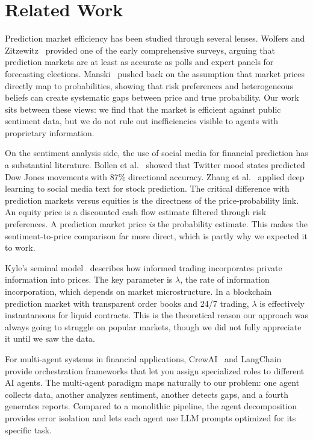 \documentclass[conference]{IEEEtran}
\begin{document}
\section{Related Work}

Prediction market efficiency has been studied through several lenses. Wolfers and Zitzewitz~\cite{wolfers2004} provided one of the early comprehensive surveys, arguing that prediction markets are at least as accurate as polls and expert panels for forecasting elections. Manski~\cite{manski2006} pushed back on the assumption that market prices directly map to probabilities, showing that risk preferences and heterogeneous beliefs can create systematic gaps between price and true probability. Our work sits between these views: we find that the market is efficient against public sentiment data, but we do not rule out inefficiencies visible to agents with proprietary information.

On the sentiment analysis side, the use of social media for financial prediction has a substantial literature. Bollen et al.~\cite{bollen2011} showed that Twitter mood states predicted Dow Jones movements with 87\% directional accuracy. Zhang et al.~\cite{zhang2018} applied deep learning to social media text for stock prediction. The critical difference with prediction markets versus equities is the directness of the price-probability link. An equity price is a discounted cash flow estimate filtered through risk preferences. A prediction market price \emph{is} the probability estimate. This makes the sentiment-to-price comparison far more direct, which is partly why we expected it to work.

Kyle's seminal model~\cite{kyle1985} describes how informed trading incorporates private information into prices. The key parameter is $\lambda$, the rate of information incorporation, which depends on market microstructure. In a blockchain prediction market with transparent order books and 24/7 trading, $\lambda$ is effectively instantaneous for liquid contracts. This is the theoretical reason our approach was always going to struggle on popular markets, though we did not fully appreciate it until we saw the data.

For multi-agent systems in financial applications, CrewAI~\cite{crewai2024} and LangChain~\cite{langchain2023} provide orchestration frameworks that let you assign specialized roles to different AI agents. The multi-agent paradigm maps naturally to our problem: one agent collects data, another analyzes sentiment, another detects gaps, and a fourth generates reports. Compared to a monolithic pipeline, the agent decomposition provides error isolation and lets each agent use LLM prompts optimized for its specific task.
\end{document}
